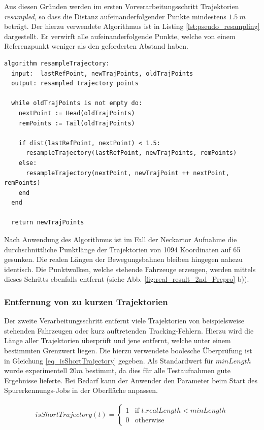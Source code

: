 Aus diesen Gründen werden im ersten Vorverarbeitungsschritt Trajektorien \textit{resampled}, so dass die Distanz
aufeinanderfolgender Punkte mindestens $1.5\ m$ beträgt.
Der hierzu verwendete Algorithmus ist in Listing \ref{lst:pseudo_resampling} dargestellt.
Er verwirft alle aufeinanderfolgende Punkte, welche von einem Referenzpunkt weniger als den geforderten Abstand haben.
\begin{lstlisting}[caption=Pseudocode Trajektorie Resampling, language=Pseudo, label=lst:pseudo_resampling]
algorithm resampleTrajectory:
  input:  lastRefPoint, newTrajPoints, oldTrajPoints
  output: resampled trajectory points

  while oldTrajPoints is not empty do:
    nextPoint := Head(oldTrajPoints)
    remPoints := Tail(oldTrajPoints)

    if dist(lastRefPoint, nextPoint) < 1.5:
      resampleTrajectory(lastRefPoint, newTrajPoints, remPoints)
    else:
      resampleTrajectory(nextPoint, newTrajPoint ++ nextPoint, remPoints)
    end
  end

  return newTrajPoints
\end{lstlisting}

Nach Anwendung des Algorithmus ist im Fall der Neckartor Aufnahme die durchschnittliche Punktlänge
der Trajektorien von 1094 Koordinaten auf 65 gesunken. Die realen Längen der Bewegungsbahnen bleiben
hingegen nahezu identisch. Die Punktwolken, welche stehende Fahrzeuge erzeugen, werden mittels dieses
Schritts ebenfalls entfernt (siehe Abb. \ref{fig:real_result_2nd_Prepro} b)).

\subsubsection{Entfernung von zu kurzen Trajektorien}
Der zweite Verarbeitungsschritt entfernt viele Trajektorien von beispielsweise stehenden Fahrzeugen
oder kurz auftretenden Tracking-Fehlern.
Hierzu wird die Länge aller Trajektorien überprüft und jene entfernt, welche
unter einem bestimmten Grenzwert liegen. Die hierzu verwendete boolesche Überprüfung ist in Gleichung
\ref{eq_isShortTrajectory} gegeben.
Als Standardwert für $minLength$ wurde experimentell $20m$ bestimmt, da dies für alle
Testaufnahmen gute Ergebnisse lieferte. Bei Bedarf kann der Anwender den Parameter beim Start des Spurerkennungs-Jobs
in der Oberfläche anpassen.

\begin{ceqn}
\begin{align}
\label{eq_isShortTrajectory}
    isShortTrajectory(t) =
    \begin{cases}
        1 & \text{if } t.realLength < minLength \\
        0 & \text{otherwise}
    \end{cases}
\end{align}
\end{ceqn}

